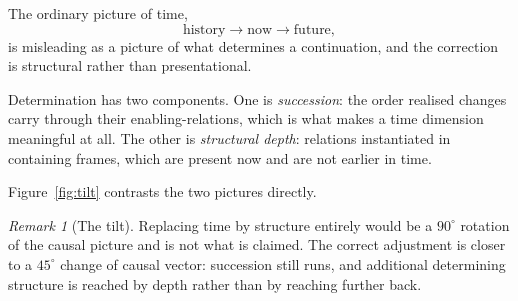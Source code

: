 \documentclass[11pt,a4paper]{article}
\theoremstyle{remark}
\newtheorem{remark}[definition]{Remark}
\begin{document}
The ordinary picture of time,
\[
\text{history}\rightarrow\text{now}\rightarrow\text{future},
\]
is misleading as a picture of what determines a continuation, and the correction is structural rather than presentational.

Determination has two components. One is \emph{succession}: the order realised changes carry through their enabling-relations, which is what makes a time dimension meaningful at all. The other is \emph{structural depth}: relations instantiated in containing frames, which are present now and are not earlier in time.

Figure~\ref{fig:tilt} contrasts the two pictures directly.

\begin{remark}[The tilt]\label{rem:tilt}
Replacing time by structure entirely would be a $90^{\circ}$ rotation of the causal picture and is not what is claimed. The correct adjustment is closer to a $45^{\circ}$ change of causal vector: succession still runs, and additional determining structure is reached by depth rather than by reaching further back.
\end{remark}
\end{document}
